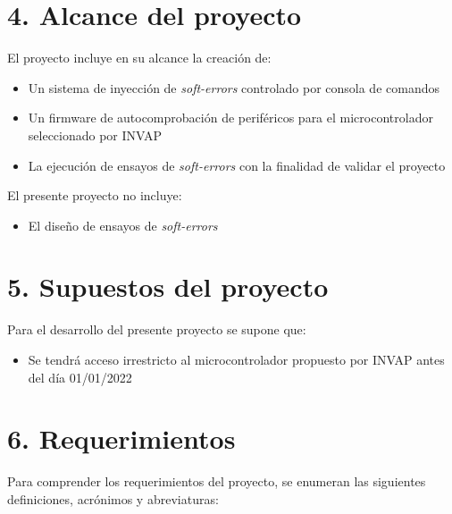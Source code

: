 \documentclass[
11pt, %
]{charter}
\begin{document}
\section{4. Alcance del proyecto}
\label{sec:alcance}

El proyecto incluye en su alcance la creación de:
\begin{itemize}
	\item Un sistema de inyección de \emph{soft-errors} controlado por consola de comandos
	\item Un firmware de autocomprobación de periféricos para el microcontrolador seleccionado por INVAP
	\item La ejecución de ensayos de \emph{soft-errors} con la finalidad de validar el proyecto
\end{itemize}

El presente proyecto no incluye:

\begin{itemize}
	\item El diseño de ensayos de \emph{soft-errors}
\end{itemize}


\section{5. Supuestos del proyecto}
\label{sec:supuestos}

Para el desarrollo del presente proyecto se supone que:

\begin{itemize}
	\item Se tendrá acceso irrestricto al microcontrolador propuesto por INVAP antes del día 01/01/2022
\end{itemize}


\section{6. Requerimientos}
\label{sec:requerimientos}

Para comprender los requerimientos del proyecto, se enumeran las siguientes definiciones, acrónimos y abreviaturas:
\end{document}
